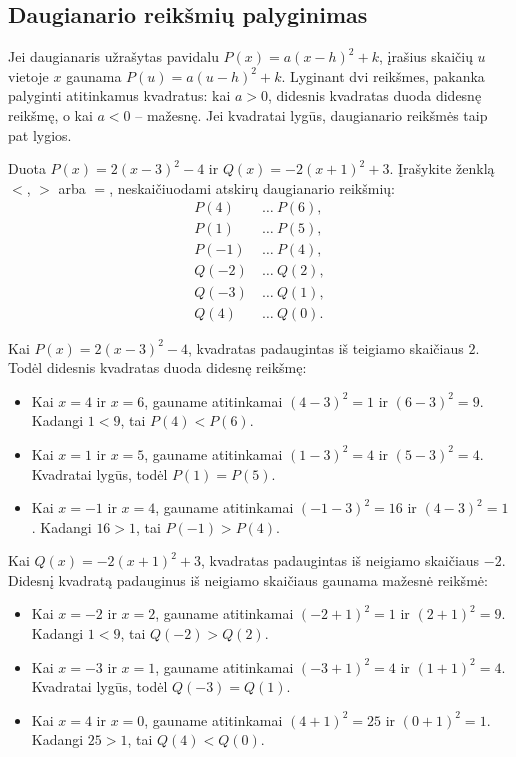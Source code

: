 \documentclass[11pt,a4paper]{scrartcl}
\numberwithin{exercise}{section}
\begin{document}
\subsection{Daugianario reikšmių palyginimas}

Jei daugianaris užrašytas pavidalu $P(x)=a(x-h)^2+k$, įrašius skaičių $u$ vietoje $x$ gaunama $P(u)=a(u-h)^2+k$. Lyginant dvi reikšmes, pakanka palyginti atitinkamus kvadratus: kai $a>0$, didesnis kvadratas duoda didesnę reikšmę, o kai $a<0$ -- mažesnę. Jei kvadratai lygūs, daugianario reikšmės taip pat lygios.

\begin{example}\label{pv:palyginti_reiksmes}
Duota $P(x)=2(x-3)^2-4$ ir $Q(x)=-2(x+1)^2+3$. Įrašykite ženklą $<$, $>$ arba $=$, neskaičiuodami atskirų daugianario reikšmių:
\[
\begin{aligned}
P(4)&\ \ldots\ P(6),\\
P(1)&\ \ldots\ P(5),\\
P(-1)&\ \ldots\ P(4),\\
Q(-2)&\ \ldots\ Q(2),\\
Q(-3)&\ \ldots\ Q(1),\\
Q(4)&\ \ldots\ Q(0).
\end{aligned}
\]
\end{example}

\begin{solution}
Kai $P(x)=2(x-3)^2-4$, kvadratas padaugintas iš teigiamo skaičiaus $2$. Todėl didesnis kvadratas duoda didesnę reikšmę:
\begin{itemize}
\item Kai $x=4$ ir $x=6$, gauname atitinkamai $(4-3)^2=1$ ir $(6-3)^2=9$. Kadangi $1<9$, tai $P(4)<P(6)$.
\item Kai $x=1$ ir $x=5$, gauname atitinkamai $(1-3)^2=4$ ir $(5-3)^2=4$. Kvadratai lygūs, todėl $P(1)=P(5)$.
\item Kai $x=-1$ ir $x=4$, gauname atitinkamai $(-1-3)^2=16$ ir $(4-3)^2=1$. Kadangi $16>1$, tai $P(-1)>P(4)$.
\end{itemize}

Kai $Q(x)=-2(x+1)^2+3$, kvadratas padaugintas iš neigiamo skaičiaus $-2$. Didesnį kvadratą padauginus iš neigiamo skaičiaus gaunama mažesnė reikšmė:
\begin{itemize}
\item Kai $x=-2$ ir $x=2$, gauname atitinkamai $(-2+1)^2=1$ ir $(2+1)^2=9$. Kadangi $1<9$, tai $Q(-2)>Q(2)$.
\item Kai $x=-3$ ir $x=1$, gauname atitinkamai $(-3+1)^2=4$ ir $(1+1)^2=4$. Kvadratai lygūs, todėl $Q(-3)=Q(1)$.
\item Kai $x=4$ ir $x=0$, gauname atitinkamai $(4+1)^2=25$ ir $(0+1)^2=1$. Kadangi $25>1$, tai $Q(4)<Q(0)$.
\end{itemize}
\end{solution}
\end{document}
